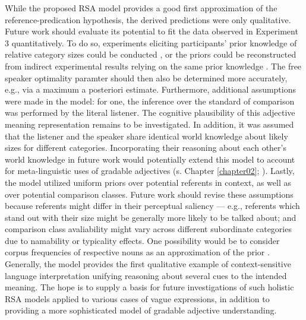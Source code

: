 While the proposed RSA model provides a good first approximation of the reference-predication hypothesis, the derived predictions were only qualitative. Future work should evaluate its potential to fit the data observed in Experiment 3 quantitatively. To do so, experiments eliciting participants' prior knowledge of relative category sizes could be conducted \parencite{franke2016does}, or the priors could be reconstructed from indirect experimental results relying on the same prior knowledge \parencite[following][]{tessler2017warm}. The free speaker optimality paramter should then also be determined more accurately, e.g., via a maximum a posteriori estimate. %
Furthermore, additional assumptions were made in the model: for one, the inference over the standard of comparison was performed by the literal listener. The cognitive plausibility of this adjective meaning representation remains to be investigated. In addition, it was assumed that the listener and the speaker share identical world knowledge about likely sizes for different categories. Incorporating their reasoning about each other's world knowledge in future work would potentially extend this model to account for meta-linguistic uses of gradable adjectives (s. Chapter \ref{chapter02}; \textcite{barker2002dynamics}). Lastly, the model utilized uniform priors over potential referents in context, as well as over potential comparison classes. Future work should revise these assumptions because referents might differ in their perceptual saliency --- e.g., referents which stand out with their size might be generally more likely to be talked about; and comparison class avaliability might vary across different subordinate categories due to namability or typicality effects. One possibility would be to consider corpus frequencies of respective nouns as an approximation of the prior \parencite[following the model by][]{tessler2017warm}. Generally, the model provides the first qualitative example of context-sensitive language interpretation unifying reasoning about several cues to the intended meaning. The hope is to supply a basis for future investigations of such holistic RSA models applied to various cases of vague expressions, in addition to providing a more sophisticated model of gradable adjective understanding.

